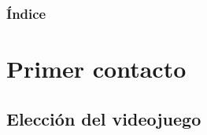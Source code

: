 \documentclass[9pt,xcolor=svgnames]{beamer}
\begin{document}


\begin{frame}
 \titlepage
\end{frame}

\normalsize

\begin{frame}
 \frametitle{Índice} 
 \transboxin
 \tableofcontents
\end{frame}
  
  
 \section{Primer contacto}
 
  \subsection{Elección del videojuego}
  
\end{document}
